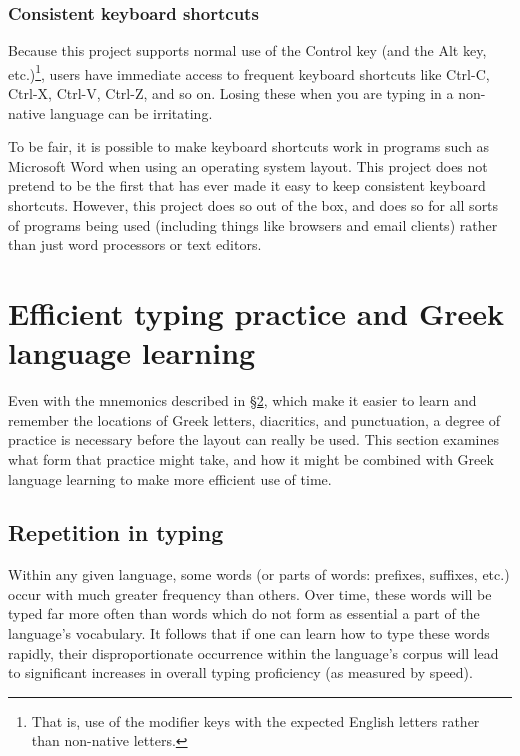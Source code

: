 \documentclass[11pt]{article}
\begin{document}
\subsubsection{Consistent keyboard shortcuts}
\label{sec:orgadfa384}

Because this project supports normal use of the Control key (and the Alt key, etc.)\footnote{That is, use of the modifier keys with the expected English letters rather than non-native letters.}, users have immediate access to frequent keyboard shortcuts like Ctrl-C, Ctrl-X, Ctrl-V, Ctrl-Z, and so on. Losing these when you are typing in a non-native language can be irritating.

To be fair, it is possible to make keyboard shortcuts work in programs such as Microsoft Word when using an operating system layout. This project does not pretend to be the first that has ever made it easy to keep consistent keyboard shortcuts. However, this project does so out of the box, and does so for all sorts of programs being used (including things like browsers and email clients) rather than just word processors or text editors.

\section{Efficient typing practice and Greek language learning}
\label{sec:org762056f}

Even with the mnemonics described in \hyperref[sec:org5623cd4]{§2}, which make it easier to learn and remember the locations of Greek letters, diacritics, and punctuation, a degree of practice is necessary before the layout can really be used. This section examines what form that practice might take, and how it might be combined with Greek language learning to make more efficient use of time.

\subsection{Repetition in typing}
\label{sec:org9e4a11d}

Within any given language, some words (or parts of words: prefixes, suffixes, etc.) occur with much greater frequency than others. Over time, these words will be typed far more often than words which do not form as essential a part of the language's vocabulary. It follows that if one can learn how to type these words rapidly, their disproportionate occurrence within the language's corpus will lead to significant increases in overall typing proficiency (as measured by speed).
\end{document}
